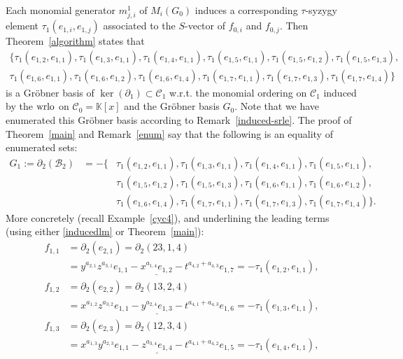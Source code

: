 \documentclass[ALCO]{cedram}
\newcommand{\mbk}{\mbox{$\mathbb{K}$}}
\newcommand{\mcb}{\mbox{$\mathcal{B}$}}
\newcommand{\mcc}{\mbox{$\mathcal{C}$}}
\newcommand{\dif}{\mbox{$\partial$}}
\newcommand{\wrlo}{\mbox{${\rm wrlo}$}}
\begin{document}
Each monomial generator $m^1_{j,i}$ of $M_i(G_0)$ induces a
corresponding $\tau$-syzygy element $\tau_1(e_{1,i},e_{1,j})$
associated to the $S$-vector of $f_{0,i}$ and $f_{0,j}$. Then
Theorem~\ref{algorithm} states that
\begin{gather*}
\{\tau_1(e_{1,2},e_{1,1}),\tau_1(e_{1,3},e_{1,1}),\tau_1(e_{1,4},e_{1,1}),
    \tau_1(e_{1,5},e_{1,1}),\tau_1(e_{1,5},e_{1,2}),\tau_1(e_{1,5},e_{1,3}),\\
    \tau_1(e_{1,6},e_{1,1}),\tau_1(e_{1,6},e_{1,2}),\tau_1(e_{1,6},e_{1,4}),
    \tau_1(e_{1,7},e_{1,1}),\tau_1(e_{1,7},e_{1,3}),\tau_1(e_{1,7},e_{1,4})\}
\end{gather*}
is a Gr\"obner basis of $\ker(\dif_1)\subset\mcc_1$ w.r.t. the monomial
ordering on $\mcc_1$ induced by the $\wrlo$ on $\mcc_0=\mbk[x]$ and
the Gr\"obner basis $G_0$. Note that we have enumerated this Gr\"obner
basis according to Remark~\ref{induced-srle}. The proof of
Theorem~\ref{main} and Remark~\ref{enum} say that the following is an
equality of enumerated sets:
\begin{eqnarray*}
G_1:=\dif_2(\mcb_2)&=-\{& \tau_1(e_{1,2},e_{1,1}),
\tau_1(e_{1,3},e_{1,1}),\tau_1(e_{1,4},e_{1,1}),
\tau_1(e_{1,5},e_{1,1}), \\ &&
\tau_1(e_{1,5},e_{1,2}),\tau_1(e_{1,5},e_{1,3}),
\tau_1(e_{1,6},e_{1,1}),\tau_1(e_{1,6},e_{1,2}), \\ &&
\tau_1(e_{1,6},e_{1,4}), \tau_1(e_{1,7},e_{1,1}),
\tau_1(e_{1,7},e_{1,3}),\tau_1(e_{1,7},e_{1,4})\}.
\end{eqnarray*}
More concretely (recall Example~\ref{cyc4}), and underlining the
leading terms (using either \eqref{inducedlm} or Theorem~\ref{main}):
\begin{align*}
f_{1,1}&= \dif_{2}(e_{2,1})=\dif_2(23,1,4)\\
&= y^{a_{2,1}}z^{a_{3,1}}e_{1,1}-\underline{x^{a_{1,4}}e_{1,2}}-
t^{a_{4,2}+a_{4,3}}e_{1,7}=-\tau_1(e_{1,2},e_{1,1}),\\
f_{1,2}&= \dif_{2}(e_{2,2})=\dif_2(13,2,4) \\
&=x^{a_{1,2}}z^{a_{3,2}}e_{1,1}-\underline{y^{a_{2,4}}e_{1,3}}-
t^{a_{4,1}+a_{4,3}}e_{1,6}=-\tau_1(e_{1,3},e_{1,1}),\\
f_{1,3}&= \dif_{2}(e_{2,3})=\dif_2(12,3,4)\\
&=x^{a_{1,3}}y^{a_{2,3}}e_{1,1}-\underline{z^{a_{3,4}}e_{1,4}}-
t^{a_{4,1}+a_{4,2}}e_{1,5}=-\tau_1(e_{1,4},e_{1,1}),%
\end{align*}
\end{document}
